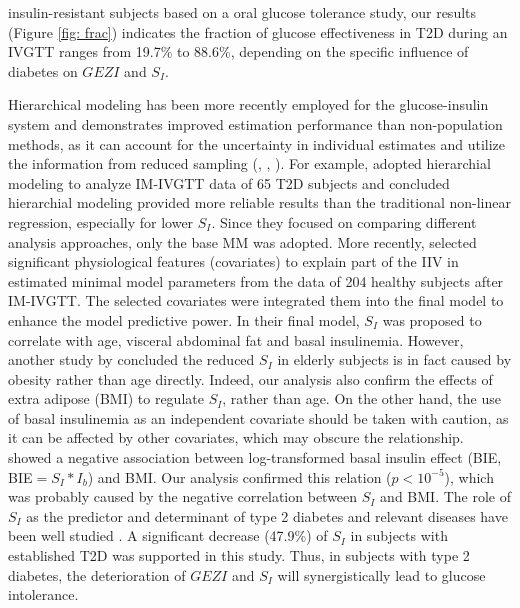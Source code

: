 \documentclass[utf8]{frontiersSCNS} %
\begin{document}
insulin-resistant subjects based on a oral glucose tolerance study, our results (Figure \ref{fig: frac}) indicates the fraction of glucose effectiveness in T2D during an IVGTT ranges from 19.7\% to 88.6\%, depending on the specific influence of diabetes on $GEZI$ and $S_I$.  

Hierarchical modeling has been more recently employed for the glucose-insulin system and demonstrates improved estimation performance than non-population methods, as it can account for the uncertainty in individual estimates and utilize the information from reduced sampling (\citet{agbaje_2003}, \citet{Denti2009}, \citet{Denti2010}). For example, \citet{agbaje_2003} adopted hierarchial modeling to analyze IM-IVGTT data of 65 T2D subjects and concluded hierarchial modeling provided more reliable results than the traditional non-linear regression, especially for lower $S_I$. Since they focused on comparing different analysis approaches, only the base MM was adopted. More recently, \citet{Denti2010} selected significant physiological features (covariates) to explain part of the IIV in estimated minimal model parameters from the data of 204 healthy subjects after IM-IVGTT. The selected covariates were integrated them into the final model to enhance the model predictive power. In their final model, $S_I$ was proposed to correlate with age, visceral abdominal fat and basal insulinemia. However, another study by \citet{helen_2010_age} concluded the reduced $S_I$ in elderly subjects is in fact caused by obesity rather than age directly. Indeed, our analysis also confirm the effects of extra adipose (BMI) to regulate $S_I$, rather than age. On the other hand, the use of basal insulinemia as an independent covariate should be taken with caution, as it can be affected by other covariates, which may obscure the relationship. \citet{Morettini_2019} showed a negative association between log-transformed basal insulin effect (BIE, BIE$=S_I*I_b$) and BMI. Our analysis confirmed this relation ($p<10^{-5}$), which was probably caused by the negative correlation between $S_I$ and BMI. The role of $S_I$ as the predictor and determinant of type 2 diabetes and relevant diseases have been well studied \citep{Bergman1997TheTolerance}. A significant decrease (47.9\%) of $S_I$ in subjects with established T2D was supported in this study. Thus, in subjects with type 2 diabetes, the deterioration of $GEZI$ and $S_I$ will synergistically lead to glucose intolerance. 
\end{document}
